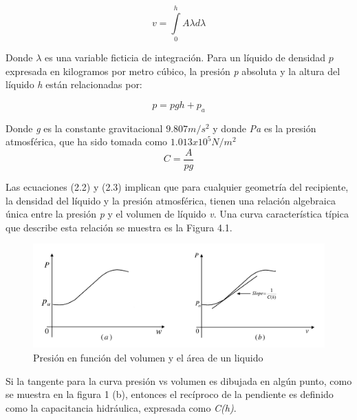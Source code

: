 \documentclass[a4paper,12pt,twoside]{proyectotanquesecci}
\begin{document}
\begin{equation}
v=\int \limits_{0}^{h} A{\lambda}d{\lambda}
\label{Ecu 2}
\end{equation}

Donde ${\lambda}$ es una variable ficticia de integración. Para un líquido de densidad $p$ expresada en kilogramos por metro cúbico, la presión \textit{p} absoluta y la altura del líquido \textit{h} están relacionadas por:

\begin{equation}
p=pgh+p_{a}
\label{Ecu 3}
\end{equation}

Donde \textit{g} es la constante gravitacional ${9.807 m/s^{2}}$ y donde \textit{Pa} es la presión atmosférica, que ha sido tomada como ${1.013 x 10^{5}  N/m^{2}}$\\

\begin{equation}
C=\frac{A}{pg}
\label{Ecu 4}
\end{equation}

Las ecuaciones (2.2) y (2.3) implican que para cualquier geometría del recipiente, la densidad del líquido y la presión atmosférica, tienen una relación algebraica única entre la presión \textit{p} y el volumen de líquido \textit{v}. Una curva característica típica que describe esta relación se muestra es la Figura 4.1.


\begin{figure}[h]
\centering
\includegraphics[scale=0.4]{Figura1}
\renewcommand{\figurename}{Fig.}
\caption{Presión en función del volumen y el área de un liquido}
\label{Presión en función del volumen y el área de un liquido}
\end{figure}

Si la tangente para la curva  presión vs volumen es dibujada en algún punto, como se muestra en la figura 1 (b), entonces el recíproco de la pendiente es definido como la capacitancia hidráulica, expresada como \textit{C(h)}.\\
\end{document}

